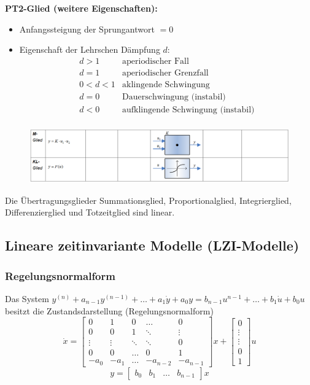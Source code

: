 \documentclass[10pt,a4paper]{article}
\newcommand{\vect}[1]{\ensuremath{\begin{bmatrix}#1\end{bmatrix}}}
\begin{document}
\textbf{PT2-Glied (weitere Eigenschaften):} \\
\begin{itemize}
	\item Anfangssteigung der Sprungantwort $= 0$
	\item Eigenschaft der Lehrschen Dämpfung $d$:
	$$
		\begin{array}{ll}
		d > 1 & \text{aperiodischer Fall} \\
		d = 1 & \text{aperiodischer Grenzfall} \\
		0 < d < 1 & \text{aklingende Schwingung} \\
		d = 0 & \text{Dauerschwingung (instabil)} \\
		d < 0 & \text{aufklingende Schwingung (instabil)} \\
		
		\end{array}
	$$
\end{itemize}

\begin{figure}[H]
	\includegraphics[width=1\columnwidth]{imgs/bb2_2d.png}
\end{figure}

Die Übertragungsglieder Summationsglied, Proportionalglied, Integrierglied, Differenzierglied und Totzeitglied sind linear.

\subsection{Lineare zeitinvariante Modelle (LZI-Modelle)}
\subsubsection{Regelungsnormalform}

Das System $y^{(n)} + a_{n-1} y^{(n-1)} + \dots + a_1 \dot y + a_0 y = b_{n-1} u^{n-1} + \dots + b_1 \dot u + b_0 u$ \\
besitzt die Zustandsdarstellung (Regelungsnormalform)
$$
\dot x = \begin{bmatrix}
0 & 1 & 0 & \dots & 0 \\
0 & 0 & 1 & \ddots & \vdots \\
\vdots & \vdots & \ddots & \ddots & 0 \\
0 & 0 & \dots & 0 & 1 \\
-a_0 & -a_1 & \dots & -a_{n-2} & -a_{n-1}
\end{bmatrix} x + \vect{0 \\ \vdots \\ \vdots \\ 0 \\ 1} u
$$
$$
y = \vect{b_0 & b_1 & \dots & b_{n-1}} x
$$
\end{document}
